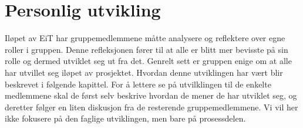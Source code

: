 \chapter{Personlig utvikling}
Iløpet av EiT har gruppemedlemmene måtte analysere og reflektere over egne roller i gruppen. 
Denne refleksjonen fører til at alle er blitt mer bevisste på sin rolle og dermed utviklet seg ut fra det. 
Genrelt sett er gruppen enige om at alle har utvillet seg iløpet av prosjektet. 
Hvordan denne utviklingen har vært blir beskrevet i følgende kapittel. 
For å lettere se på utvilklingen til de enkelte medlemmene skal de først selv beskrive hvordan de mener de har utviklet seg, og deretter følger en liten diskusjon fra de resterende gruppemedlemmene. 
Vi vil her ikke fokusere på den faglige utviklingen, men bare på prosessdelen. 





